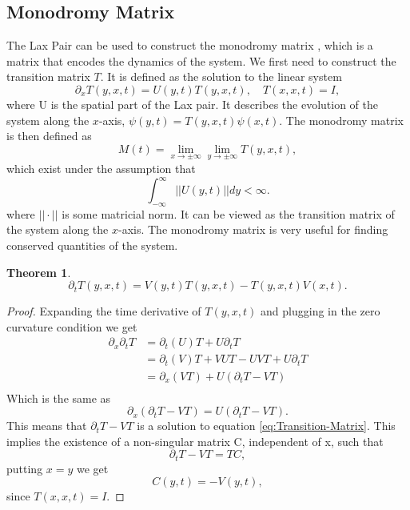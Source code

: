 \documentclass[english,master]{liumaiex}
\theoremstyle{plain}
\newtheorem{theorem}[proposition]{Theorem}
\theoremstyle{definition}
\begin{document}
\subsection{Monodromy Matrix}
The Lax Pair can be used to construct the monodromy matrix \cite{Avendano2008,Krishnaswami_2021}, which is a matrix that encodes the dynamics of the system. We first need to construct the transition matrix $T$. It is defined as the solution to the linear system
\begin{equation}
	\partial_x T(y,x,t) = U(y,t) T(y,x,t), \quad T(x,x,t) = I,
\end{equation}
where U is the spatial part of the Lax pair. It describes the evolution of the system along the $x$-axis, $\psi(y,t) = T(y,x,t) \psi(x, t)$. The monodromy matrix is then defined as
\begin{equation}
	M(t) =
		\lim_{x \rightarrow \pm \infty} \lim_{y \rightarrow \pm \infty} T(y,x,t),
\end{equation}
which exist under the assumption that
\begin{equation}
	\int_{-\infty}^{\infty} ||U(y,t)|| dy < \infty.
\end{equation}
where $||\cdot||$ is some matricial norm. It can be viewed as the transition matrix of the system along the $x$-axis. The monodromy matrix is very useful for finding conserved quantities of the system.
\begin{theorem}
	\begin{equation} \label{eq:Transition-Matrix}
		\partial_t T(y,x,t) = V(y,t) T(y,x,t) - T(y,x,t) V(x,t).
	\end{equation}
\end{theorem}
\begin{proof}
	Expanding the time derivative of $T(y,x,t)$ and plugging in the zero curvature condition we get
	\begin{equation}
	\begin{aligned}
		\partial_x \partial_t T
			&= \partial_t (U) T + U \partial_t T \\
			&= \partial_t (V)T + VUT - UVT + U \partial_t T \\
			&= \partial_x (VT) + U(\partial_t T - VT) \\
	\end{aligned}
	\end{equation}
	Which is the same as
	\begin{equation}
		\partial_x (\partial_t T - VT) = U(\partial_t T - VT).
	\end{equation}
	This means that $\partial_t T - VT$ is a solution to equation \eqref{eq:Transition-Matrix}.
	This implies the existence of a non-singular matrix C, independent of x, such that
	\begin{equation}
		\partial_t T - VT = TC,
	\end{equation}
	putting $x = y$ we get
	\begin{equation}
		C(y,t) = -V(y,t),
	\end{equation}
	since $T(x,x,t) = I$.
\end{proof}
\end{document}
